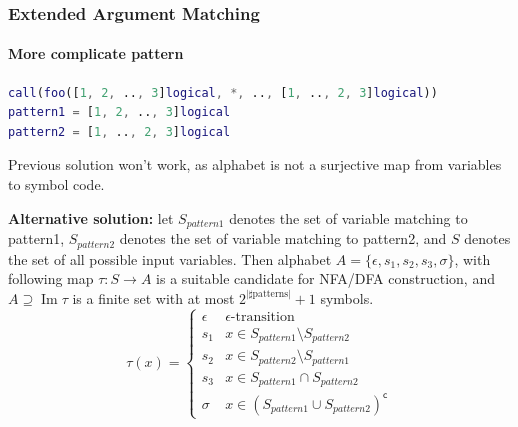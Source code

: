 \documentclass[10pt]{beamer}
\DeclareMathOperator{\Ima}{Im}
\begin{document}
\begin{frame}[fragile]
\frametitle{Extended Argument Matching}
\framesubtitle{More complicate pattern}
\begin{lstlisting}[basicstyle=\small, language=MATLAB]
call(foo([1, 2, .., 3]logical, *, .., [1, .., 2, 3]logical))
pattern1 = [1, 2, .., 3]logical
pattern2 = [1, .., 2, 3]logical
\end{lstlisting}
Previous solution won't work, as alphabet is not a surjective map from
variables to symbol code.

\textbf{Alternative solution:}
let $S_{pattern1}$ denotes the set of variable matching to pattern1, 
$S_{pattern2}$ denotes the set of variable matching to pattern2, and $S$
denotes the set of all possible input variables. Then alphabet $A =
\lbrace \epsilon, s_1, s_2, s_3, \sigma \rbrace$, with following map $\tau : S
\rightarrow A$ is a suitable candidate for NFA/DFA construction, and
$A \supseteq \Ima \tau$ is a finite set with at most $2^{\vert \sharp
\text{patterns}
\vert} + 1$ symbols.
\begin{equation*}
    \tau(x) = 
         \begin{cases}
            \epsilon       &\epsilon \text{-transition}                      \\
            s_1            &x \in S_{pattern1} \setminus S_{pattern2}        \\
            s_2            &x \in S_{pattern2} \setminus S_{pattern1}        \\
            s_3            &x \in S_{pattern1} \cap S_{pattern2}             \\
            \sigma         &x \in (S_{pattern1} \cup S_{pattern2})^{\mathsf{c}}
        \end{cases}
\end{equation*}

\end{frame}
\end{document}
